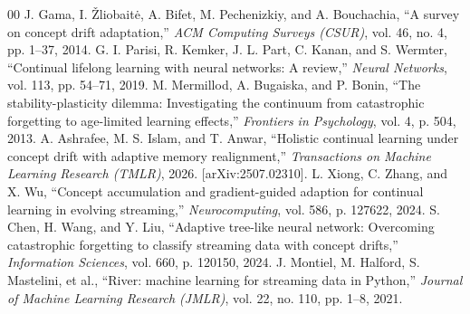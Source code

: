 \documentclass[conference]{IEEEtran}
\begin{document}

\begin{thebibliography}{00}
 J. Gama, I. \v{Z}liobait\.{e}, A. Bifet, M. Pechenizkiy, and A. Bouchachia, ``A survey on concept drift adaptation,'' \textit{ACM Computing Surveys (CSUR)}, vol. 46, no. 4, pp. 1--37, 2014.
 G. I. Parisi, R. Kemker, J. L. Part, C. Kanan, and S. Wermter, ``Continual lifelong learning with neural networks: A review,'' \textit{Neural Networks}, vol. 113, pp. 54--71, 2019.
 M. Mermillod, A. Bugaiska, and P. Bonin, ``The stability-plasticity dilemma: Investigating the continuum from catastrophic forgetting to age-limited learning effects,'' \textit{Frontiers in Psychology}, vol. 4, p. 504, 2013.
 A. Ashrafee, M. S. Islam, and T. Anwar, ``Holistic continual learning under concept drift with adaptive memory realignment,'' \textit{Transactions on Machine Learning Research (TMLR)}, 2026. [arXiv:2507.02310].
 L. Xiong, C. Zhang, and X. Wu, ``Concept accumulation and gradient-guided adaption for continual learning in evolving streaming,'' \textit{Neurocomputing}, vol. 586, p. 127622, 2024.
 S. Chen, H. Wang, and Y. Liu, ``Adaptive tree-like neural network: Overcoming catastrophic forgetting to classify streaming data with concept drifts,'' \textit{Information Sciences}, vol. 660, p. 120150, 2024.
 J. Montiel, M. Halford, S. Mastelini, et al., ``River: machine learning for streaming data in Python,'' \textit{Journal of Machine Learning Research (JMLR)}, vol. 22, no. 110, pp. 1--8, 2021.
\end{thebibliography}
\end{document}
